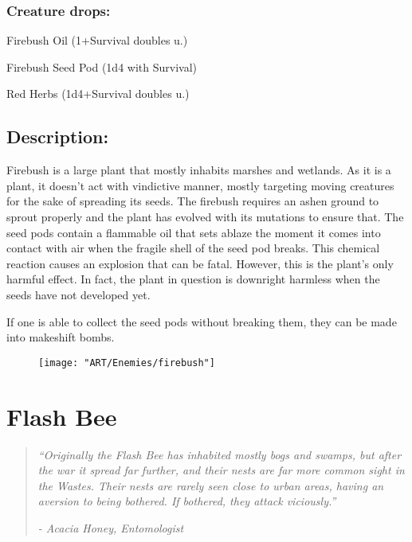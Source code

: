\documentclass[11pt,a4paper,twocolumn]{book}
\begin{document}
	\subsubsection*{Creature drops:}
	\begin{compactitem}
		\item Firebush Oil (1+Survival doubles u.)
		\item Firebush Seed Pod (1d4 with Survival)
		\item Red Herbs (1d4+Survival doubles u.)
	\end{compactitem}
	
	\subsection*{Description:}
	Firebush is a large plant that mostly inhabits marshes and wetlands. As it is a plant, it doesn't act with vindictive manner, mostly targeting moving creatures for the sake of spreading its seeds. The firebush requires an ashen ground to sprout properly and the plant has evolved with its mutations to ensure that. The seed pods contain a flammable oil that sets ablaze the moment it comes into contact with air when the fragile shell of the seed pod breaks. This chemical reaction causes an explosion that can be fatal. However, this is the plant's only harmful effect. In fact, the plant in question is downright harmless when the seeds have not developed yet.
	
	If one is able to collect the seed pods without breaking them, they can be made into makeshift bombs.
	
	\begin{figure}[h]
		\centering
		\texttt{[image: "ART/Enemies/firebush"]}
	\end{figure}
	
	\clearpage
	
	\section*{Flash Bee}
	\begin{quote}
		\emph{``Originally the Flash Bee has inhabited mostly bogs and swamps, but after the war it spread far further, and their nests are far more common sight in the Wastes. Their nests are rarely seen close to urban areas, having an aversion to being bothered. If bothered, they attack viciously.''}
		
		\emph{-	Acacia Honey, Entomologist}
	\end{quote}
	
\end{document}
